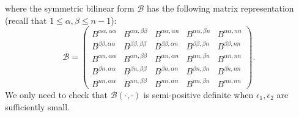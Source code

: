 \documentclass[12pt]{article}
\numberwithin{equation}{section}
\theoremstyle{plain}
\theoremstyle{definition}
\theoremstyle{remark}
\begin{document}
where the symmetric bilinear form $\mathcal{B}$ has the following matrix representation
(recall that $1\leq\alpha, \beta \leq n-1$):
\begin{equation} \label{eq:B_matrep}
\mathcal{B} = \left(
\begin{array}{cc|cc|c}
B^{\alpha\alpha, \alpha\alpha} &  B^{\alpha\alpha,\beta\beta}  &  B^{\alpha\alpha,\alpha n}  & B^{\alpha\alpha,\beta n} & B^{\alpha\alpha,n n}  \\
B^{\beta\beta,\alpha\alpha} &  B^{\beta\beta,\beta\beta}  & B^{\beta \beta,\alpha n} & B^{\beta \beta,\beta n} & B^{\beta \beta, n n} \\
\hline
 B^{\alpha n, \alpha\alpha} & B^{\alpha n,\beta\beta} &   B^{\alpha n, \alpha n}  &   B^{\alpha n,\beta n}   &  B^{\alpha n,nn}   \\
 B^{\beta n, \alpha \alpha}& B^{\beta n,\beta\beta}  &   B^{\beta n,\alpha n}   &  B^{\beta n,\beta n}  &  B^{\beta n,nn}   \\
\hline
 B^{nn, \alpha\alpha} & B^{nn,\beta\beta}   & B^{nn,\alpha n}   &  B^{n n, \beta n}  & B^{nn,nn}
\end{array}
\right).
\end{equation}
We only need to check that $\mathcal{B}(\cdot,\cdot)$ is semi-positive definite when $\epsilon_1,\epsilon_2$ are sufficiently small. 
\end{document}
